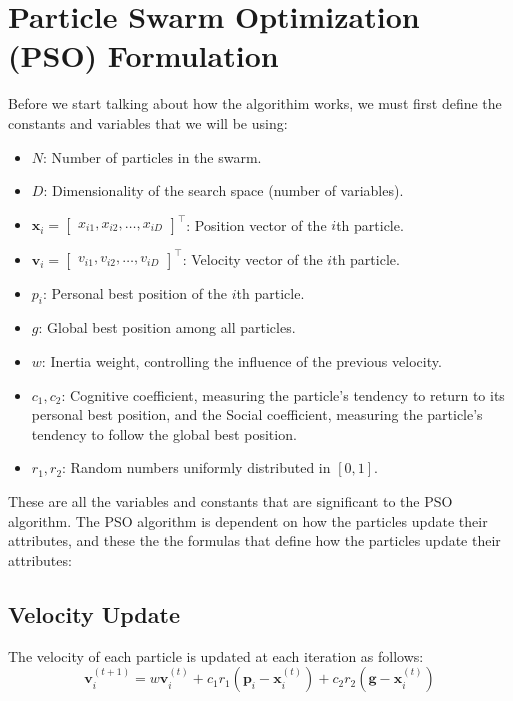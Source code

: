 \documentclass[12pt]{article}
\begin{document}
	\section{Particle Swarm Optimization (PSO) Formulation}
    Before we start talking about how the algorithim works, we must first define the constants and variables that we will be using:
	\begin{itemize}
    \item $N$: Number of particles in the swarm.
    \item $D$: Dimensionality of the search space (number of variables).
    \item $\mathbf{x}_i = \begin{bmatrix} x_{i1}, x_{i2}, \dots, x_{iD} \end{bmatrix}^\top$: Position vector of the $i$th particle.
    \item $\mathbf{v}_i = \begin{bmatrix} v_{i1}, v_{i2}, \dots, v_{iD} \end{bmatrix}^\top$: Velocity vector of the $i$th particle.
    \item $p_i$: Personal best position of the $i$th particle.
    \item $g$: Global best position among all particles.
    \item $w$: Inertia weight, controlling the influence of the previous velocity.
    \item $c_1, c_2$: Cognitive coefficient, measuring the particle's tendency to return to its personal best position, and the Social coefficient, measuring the particle's tendency to follow the global best position. 
    \item $r_1, r_2$: Random numbers uniformly distributed in $[0, 1]$.
\end{itemize}
These are all the variables and constants that are significant to the PSO algorithm. The PSO algorithm is dependent on how the particles update their attributes, and these the the formulas that define how the particles update their attributes: 

\subsection*{Velocity Update}
The velocity of each particle is updated at each iteration as follows:
\[
\mathbf{v}_i^{(t+1)} = w \mathbf{v}_i^{(t)} + c_1 r_1 \left( \mathbf{p}_i - \mathbf{x}_i^{(t)} \right) + c_2 r_2 \left( \mathbf{g} - \mathbf{x}_i^{(t)} \right)
\]
\end{document}

